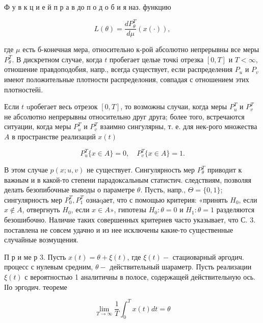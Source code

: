 \documentclass[10pt]{article}
\begin{document}
Ф у в к ц и е й п р а в до п о д о б и я наз. функцию



\[

L(\theta)=\frac{d P_{\theta}^{T}}{d \mu}(x(\cdot)),

\]



где $\mu$ есть б-конечная мера, относительно к-рой абсолютно непрерывны все меры $P_{\theta}^{T}$. В дискретном случае, когда $t$ пробегает целые точкі отрезка $[0, T]$ и $T<\infty$, отношение правдоподобия, напр., всегда существует, если распределения $P_{u}$ и $P_{v}$ имеют положительные плотности распределония, совпадая с отношением этих плотностейі.



Если $t$ uробегает весь отрезок $[0, T]$, то возможны случаи, когда меры $P_{u}^{T}$ и $P_{v}^{T}$ не абсолютно непрерывны относительно друг друга; более того, встречаются ситуации, когда меры $P_{u}^{T}$ и $P_{v}^{T}$ взаимно сингулярны, т. е. для нек-рого множества $A$ в пространстве реализаций $x(t)$



\[

P_{u}^{T}\{x \in A\}=0, \quad P_{v}^{T}\{x \in A\}=1 .

\]



В этом случае $p(x ; u, v)$ не существует. Сингулярность мер $P_{\theta}^{T}$ приводит к важным и в какой-то степени парадоксальным статистич. следствиям, позволяя делать безопибочные выводы о параметре $\theta$. Пусть, напр., $\Theta=\{0,1\}$; сингулярность мер $P_{0}^{T}, P_{1}^{T}$ ознаqает, что с помощью критерия: «принять $H_{0}$, если $x \notin A$, отвергнуть $H_{0}$, если $x \in A »$, гипотезы $H_{0}: \theta=0$ и $H_{1}: \theta=1$ разделяются безошибочно. Наличие таких совершенных критериев часто указывает, что С. 3. поставлена не совсем удачно и из нее исключены какие-то существенные случайные возмущения.



П р и ме р 3. Пусть $x(t)=\theta+\xi(t)$, где $\xi(t)-$ стациоварный әргодич. процесс с нулевым средним, $\theta-$ действительный шараметр. Пусть реализации $\xi(t)$ с вероятностью 1 аналитичны в полосе, содержащей действительную ось. ІІо эргодич. теореме



\[

\lim _{T \rightarrow \infty} \frac{1}{T} \int_{0}^{T} x(t) d t=\theta

\]
\end{document}
